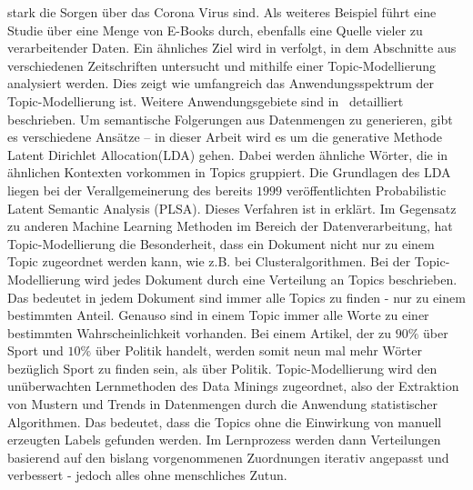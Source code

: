 \documentclass[german,version-2020-11]{uzl-thesis}
\begin{document}
stark die Sorgen über das Corona Virus sind. Als weiteres Beispiel führt \cite{t1} eine Studie über eine Menge von E-Books durch, ebenfalls eine Quelle vieler zu verarbeitender Daten. Ein ähnliches Ziel wird in \cite{t3} verfolgt, in dem Abschnitte aus verschiedenen Zeitschriften untersucht und mithilfe einer Topic-Modellierung  analysiert werden. Dies zeigt wie umfangreich das Anwendungsspektrum der Topic-Modellierung ist. Weitere Anwendungsgebiete sind in \cite{tmbook} detailliert beschrieben. Um semantische Folgerungen aus Datenmengen zu generieren, gibt es verschiedene Ansätze – in dieser Arbeit wird es um die generative Methode Latent Dirichlet Allocation(LDA) gehen. Dabei werden ähnliche Wörter, die in ähnlichen Kontexten vorkommen in Topics gruppiert. Die Grundlagen des LDA liegen bei der Verallgemeinerung des bereits $1999$ veröffentlichten Probabilistic Latent Semantic Analysis (PLSA). Dieses Verfahren ist in \cite{plsa} erklärt. Im Gegensatz zu anderen Machine Learning Methoden im Bereich der Datenverarbeitung, hat Topic-Modellierung die Besonderheit, dass ein Dokument nicht nur zu einem Topic zugeordnet werden kann, wie z.B. bei Clusteralgorithmen. Bei der Topic-Modellierung wird jedes Dokument durch eine Verteilung an Topics beschrieben. Das bedeutet in jedem Dokument sind immer alle Topics zu finden - nur zu einem bestimmten Anteil. Genauso sind in einem Topic immer alle Worte zu einer bestimmten Wahrscheinlichkeit vorhanden. Bei einem Artikel, der zu $90\%$ über Sport und $10\%$ über Politik handelt, werden somit neun mal mehr Wörter bezüglich Sport zu finden sein, als über Politik. Topic-Modellierung wird den unüberwachten Lernmethoden des Data Minings zugeordnet, also der Extraktion von Mustern und Trends in Datenmengen durch die Anwendung statistischer Algorithmen. Das bedeutet, dass die Topics ohne die Einwirkung von manuell erzeugten Labels gefunden werden. Im Lernprozess werden dann Verteilungen basierend auf den bislang vorgenommenen Zuordnungen iterativ angepasst und verbessert - jedoch alles ohne menschliches Zutun. 
\end{document}

